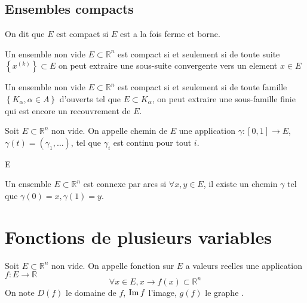 \documentclass[../main.tex]{subfiles}
\begin{document}
\subsection{Ensembles compacts}
\begin{defn}\label{defn:Ensemble compactensemble_compact}
	On dit que $E$ est compact si $E$ est a la fois ferme et borne.
\end{defn}
\begin{thm}
	Un ensemble non vide $E \subset \mathbb{R}^n$ est compact si et seulement si de toute suite $ \left\{ x^{( k) } \right\} \subset E$ on peut extraire une sous-suite convergente vers un element $x \in E$
\end{thm}
\begin{thm}
	Un ensemble non vide $E\subset \mathbb{R}^n$ est compact si et seulement si de toute famille $ \left\{ K_\alpha, \alpha\in A \right\} $ d'ouverts tel que $E \subset  K_\alpha $, on peut extraire une sous-famille finie qui est encore un recouvrement de $E$. 
\end{thm}
\begin{defn}
	Soit $E \subset \mathbb{R}^n$ non vide. On appelle chemin de $E$ une application $\gamma:[0,1] \to E$, $\gamma( t) = ( \gamma_1, \ldots) $, tel que $\gamma_i$ est continu pour tout $i$.
	
E\end{defn}
\begin{defn}
	Un ensemble $E \subset \mathbb{R}^n$ est connexe par arcs si $\forall x,y \in E$, il existe un chemin $\gamma$ tel que $\gamma( 0) =x, \gamma( 1 ) =y$.
\end{defn}

\section{Fonctions de plusieurs variables}
Soit $E\subset \mathbb{R}^n$ non vide. On appelle fonction sur $E$ a valeurs reelles une application $f: E \to \mathbb{R}$ 
\[ 
	\forall x \in E, x \to f( x) \subset \mathbb{R}^n
\]
On note $D( f) $ le domaine de $f$, $\operatorname*{Im} f$ l'image, $g( f)$ le graphe .
\end{document}
